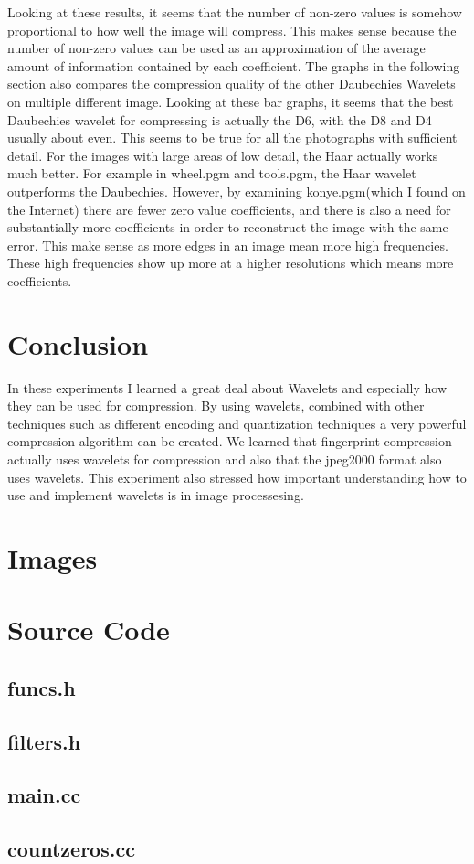 Looking at these results, it seems that the number of non-zero values is somehow proportional to how well the image will compress.  This makes sense because the number of non-zero values can be used as an approximation of the average amount of information contained by each coefficient.  The graphs in the following section also compares the compression quality of the other Daubechies Wavelets on multiple different image.  Looking at these bar graphs, it seems that the best Daubechies wavelet for compressing is actually the D6, with the D8 and D4 usually about even.  This seems to be true for all the photographs with sufficient detail.  For the images with large areas of low detail, the Haar actually works much better.  For example in wheel.pgm and tools.pgm, the Haar wavelet outperforms the Daubechies.  However, by examining konye.pgm(which I found on the Internet) there are fewer zero value coefficients, and there is also a need for substantially more coefficients in order to reconstruct the image with the same error.  This make sense as more edges in an image mean more high frequencies.  These high frequencies show up more at a higher resolutions which means more coefficients.

\section{Conclusion}

In these experiments I learned a great deal about Wavelets and especially how they can be used for compression.  By using wavelets, combined with other techniques such as different encoding and quantization techniques a very powerful compression algorithm can be created.  We learned that fingerprint compression actually uses wavelets for compression and also that the jpeg2000 format also uses wavelets.  This experiment also stressed how important understanding how to use and implement wavelets is in image processesing.

\newpage

\section{Images}
  

\newpage

\section{Source Code}
  \subsection{funcs.h}
    
	\subsection{filters.h}
		
%		
  \subsection{main.cc}
    
  \subsection{countzeros.cc}
    
